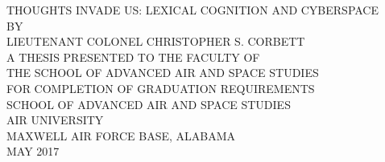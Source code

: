 \documentclass[11pt, letterpaper, titlepage]{report}
\begin{document}
	
	
	


	\begin{center}
		\thispagestyle{empty}
		THOUGHTS INVADE US:  LEXICAL COGNITION AND CYBERSPACE\\
		\vspace{3em}
		BY\\
		LIEUTENANT COLONEL CHRISTOPHER S. CORBETT\\
		\vspace{3em}
		A THESIS PRESENTED TO THE FACULTY OF\\
		THE SCHOOL OF ADVANCED AIR AND SPACE STUDIES\\
		FOR COMPLETION OF GRADUATION REQUIREMENTS\\
		\vspace{3em}
		SCHOOL OF ADVANCED AIR AND SPACE STUDIES\\
		AIR UNIVERSITY\\
		MAXWELL AIR FORCE BASE, ALABAMA\\
		MAY 2017\\	
		\vspace*{\fill}
		\newpage\null\thispagestyle{empty}
		\newpage
	\end{center}	
\end{document}
